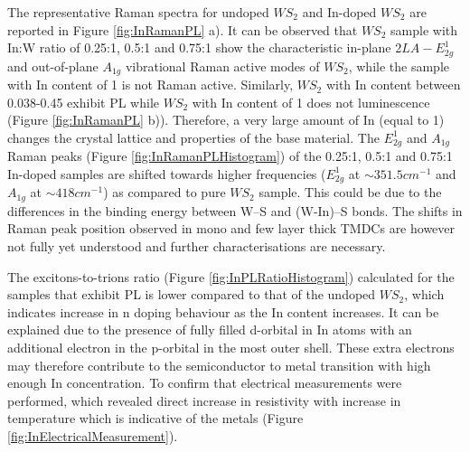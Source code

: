 The representative Raman spectra for undoped $WS_2$ and In-doped $WS_2$ are reported in Figure \ref{fig:InRamanPL} a). It can be observed that $WS_2$ sample with In:W ratio of 0.25:1, 0.5:1 and 0.75:1 show the characteristic in-plane $2LA-E^1_{2g}$ and out-of-plane $A_{1g}$ vibrational Raman active modes of $WS_2$, while the sample with In content of 1 is not Raman active. Similarly, $WS_2$ with In content between 0.038-0.45 exhibit PL while $WS_2$ with In content of 1 does not luminescence (Figure \ref{fig:InRamanPL} b)). Therefore, a very large amount of In (equal to 1) changes the crystal lattice and properties of the base material. The $E^1_{2g}$ and $A_{1g}$ Raman peaks (Figure \ref{fig:InRamanPLHistogram}) of the 0.25:1, 0.5:1 and 0.75:1 In-doped samples are shifted towards higher frequencies ($E^1_{2g}$ at $\sim 351.5 cm^{-1}$ and $A_{1g}$ at $\sim 418 cm^{-1}$) as compared to pure $WS_2$ sample. This could be due to the differences in the binding energy between W–S and (W-In)–S bonds. The shifts in Raman peak position observed in mono and few layer thick TMDCs are however not fully yet understood and further characterisations are necessary. 

The excitons-to-trions ratio (Figure \ref{fig:InPLRatioHistogram}) calculated for the samples that exhibit PL is lower compared to that of the undoped $WS_2$, which indicates increase in n doping behaviour as the In content increases. It can be explained due to the presence of fully filled d-orbital in In atoms with an additional electron in the p-orbital in the most outer shell. These extra electrons may therefore contribute to the semiconductor to metal transition with high enough In concentration. To confirm that electrical measurements were performed, which revealed direct increase in resistivity with increase in temperature which is indicative of the metals (Figure \ref{fig:InElectricalMeasurement}).

